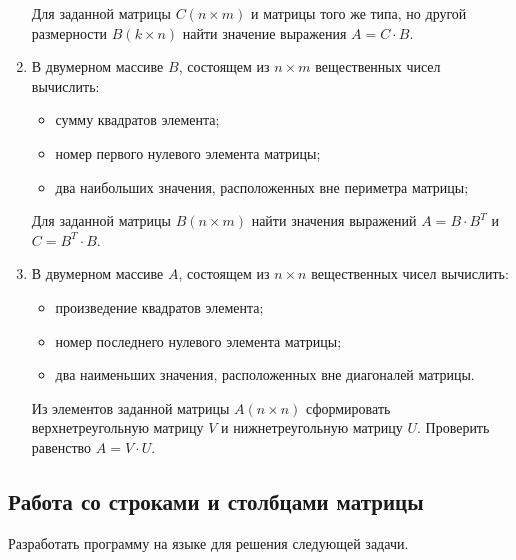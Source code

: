 \begin{enumerate}
Для заданной матрицы $C(n\times m)$ и матрицы того же типа, но другой размерности
$B(k\times n)$ найти значение выражения  $A=C\cdot B$.

\item В двумерном массиве $B$, состоящем из $n\times m$ вещественных чисел вычислить:

\begin{itemize}
\item сумму квадратов элемента;
\item номер первого нулевого элемента матрицы;
\item два наибольших значения, расположенных вне периметра матрицы;
\end{itemize}

Для заданной матрицы $B(n\times m)$ найти значения выражений  $A=B\cdot B^T$ и 
$C=B^T\cdot B$.
\item В двумерном массиве $A$, состоящем из $n\times n$ вещественных чисел
вычислить:

\begin{itemize}
\item произведение квадратов элемента;
\item номер последнего нулевого элемента матрицы;
\item два наименьших значения, расположенных вне диагоналей матрицы.
\end{itemize}

Из элементов заданной матрицы $A(n\times n)$ сформировать верхнетреугольную матрицу
$V$ и нижнетреугольную матрицу $U$. Проверить равенство  $A=V\cdot U$.
\end{enumerate}

\subsection[Работа со строками и столбцами матрицы]{Работа со строками и столбцами матрицы}
Разработать программу на языке  для решения следующей задачи.

